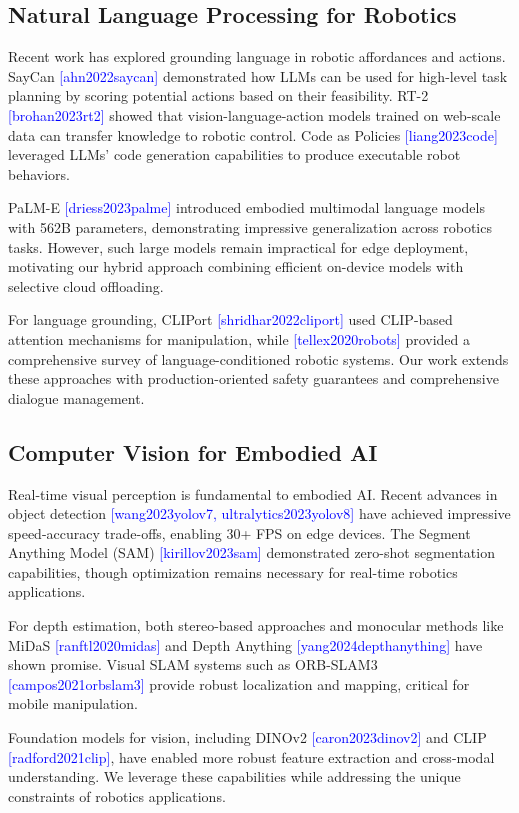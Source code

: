 \documentclass[conference]{IEEEtran}
\newcommand{\cite}[1]{\textcolor{blue}{[#1]}}
\begin{document}
\subsection{Natural Language Processing for Robotics}

Recent work has explored grounding language in robotic affordances and actions. SayCan \cite{ahn2022saycan} demonstrated how LLMs can be used for high-level task planning by scoring potential actions based on their feasibility. RT-2 \cite{brohan2023rt2} showed that vision-language-action models trained on web-scale data can transfer knowledge to robotic control. Code as Policies \cite{liang2023code} leveraged LLMs' code generation capabilities to produce executable robot behaviors.

PaLM-E \cite{driess2023palme} introduced embodied multimodal language models with 562B parameters, demonstrating impressive generalization across robotics tasks. However, such large models remain impractical for edge deployment, motivating our hybrid approach combining efficient on-device models with selective cloud offloading.

For language grounding, CLIPort \cite{shridhar2022cliport} used CLIP-based attention mechanisms for manipulation, while \cite{tellex2020robots} provided a comprehensive survey of language-conditioned robotic systems. Our work extends these approaches with production-oriented safety guarantees and comprehensive dialogue management.

\subsection{Computer Vision for Embodied AI}

Real-time visual perception is fundamental to embodied AI. Recent advances in object detection \cite{wang2023yolov7, ultralytics2023yolov8} have achieved impressive speed-accuracy trade-offs, enabling 30+ FPS on edge devices. The Segment Anything Model (SAM) \cite{kirillov2023sam} demonstrated zero-shot segmentation capabilities, though optimization remains necessary for real-time robotics applications.

For depth estimation, both stereo-based approaches and monocular methods like MiDaS \cite{ranftl2020midas} and Depth Anything \cite{yang2024depthanything} have shown promise. Visual SLAM systems such as ORB-SLAM3 \cite{campos2021orbslam3} provide robust localization and mapping, critical for mobile manipulation.

Foundation models for vision, including DINOv2 \cite{caron2023dinov2} and CLIP \cite{radford2021clip}, have enabled more robust feature extraction and cross-modal understanding. We leverage these capabilities while addressing the unique constraints of robotics applications.
\end{document}
